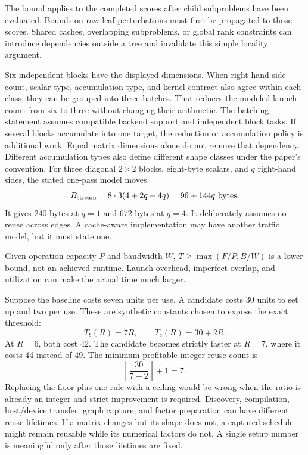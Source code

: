 The bound applies to the completed scores after child subproblems have been evaluated. Bounds on raw leaf perturbations must first be propagated to those scores. Shared caches, overlapping subproblems, or global rank constraints can introduce dependencies outside a tree and invalidate this simple locality argument.

Six independent blocks have the displayed dimensions. When right-hand-side count, scalar type, accumulation type, and kernel contract also agree within each class, they can be grouped into three batches. That reduces the modeled launch count from six to three without changing their arithmetic.
The batching statement assumes compatible backend support and independent block tasks. If several blocks accumulate into one target, the reduction or accumulation policy is additional work. Equal matrix dimensions alone do not remove that dependency. Different accumulation types also define different shape classes under the paper's convention.
For three diagonal $2\times2$ blocks, eight-byte scalars, and $q$ right-hand sides, the stated one-pass model moves
\[
B_{\rm stream}=8\cdot3(4+2q+4q)=96+144q\text{ bytes}.
\]
It gives 240 bytes at $q=1$ and 672 bytes at $q=4$. It deliberately assumes no reuse across edges. A cache-aware implementation may have another traffic model, but it must state one.

Given operation capacity $P$ and bandwidth $W$, $T\ge\max(F/P,B/W)$ is a lower bound, not an achieved runtime. Launch overhead, imperfect overlap, and utilization can make the actual time much larger.

Suppose the baseline costs seven units per use. A candidate costs 30 units to set up and two per use. These are synthetic constants chosen to expose the exact threshold:
\[
T_b(R)=7R,\qquad T_c(R)=30+2R.
\]
At $R=6$, both cost 42. The candidate becomes strictly faster at $R=7$, where it costs 44 instead of 49. The minimum profitable integer reuse count is
\[
\left\lfloor\frac{30}{7-2}\right\rfloor+1=7.
\]
Replacing the floor-plus-one rule with a ceiling would be wrong when the ratio is already an integer and strict improvement is required.
Discovery, compilation, host/device transfer, graph capture, and factor preparation can have different reuse lifetimes. If a matrix changes but its shape does not, a captured schedule might remain reusable while its numerical factors do not. A single setup number is meaningful only after those lifetimes are fixed.

